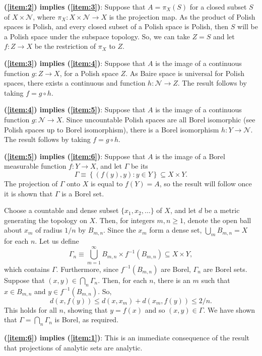 \documentclass[12pt]{article}
\begin{document}
\noindent\textbf{(\ref{item:2}) implies (\ref{item:3})}:
Suppose that $A=\pi_X(S)$ for a closed subset $S$ of $X\times \mathcal{N}$, where $\pi_X\colon X\times\mathcal{N}\to X$ is the projection map. As the product of Polish spaces is Polish, and every closed subset of a Polish space is Polish, then $S$ will be a Polish space under the subspace topology. So, we can take $Z=S$ and let $f\colon Z\to X$ be the restriction of $\pi_X$ to $Z$.

\noindent\textbf{(\ref{item:3}) implies (\ref{item:4})}:
Suppose that $A$ is the image of a continuous function $g\colon Z\to X$, for a Polish space $Z$. As Baire space is universal for Polish spaces, there exists a continuous and  function $h\colon\mathcal{N}\to Z$. The result follows by taking $f=g\circ h$.

\noindent\textbf{(\ref{item:4}) implies (\ref{item:5})}:
Suppose that $A$ is the image of a continuous function $g\colon \mathcal{N}\to X$. Since uncountable Polish spaces are all Borel isomorphic (see Polish spaces up to Borel isomorphism), there is a Borel isomorphism $h\colon Y\to\mathcal{N}$. The result follows by taking $f=g\circ h$.

\noindent\textbf{(\ref{item:5}) implies (\ref{item:6})}:
Suppose that $A$ is the image of a Borel measurable function $f\colon Y\to X$, and let $\Gamma$ be its 
\begin{equation*}
\Gamma\equiv\left\{(f(y),y)\colon y\in Y\right\}\subseteq X\times Y.
\end{equation*}
The projection of $\Gamma$ onto $X$ is equal to $f(Y)=A$, so the result will follow once it is shown that $\Gamma$ is a Borel set.

Choose a countable and dense subset $\{x_1,x_2,\ldots\}$ of $X$, and let $d$ be a metric generating the topology on $X$. Then, for integers $m,n\ge 1$, denote the open ball about $x_m$ of radius $1/n$ by $B_{m,n}$. Since the $x_m$ form a dense set, $\bigcup_mB_{m,n}=X$ for each $n$. Let us define
\begin{equation*}
\Gamma_n\equiv\bigcup_{m=1}^\infty B_{m,n}\times f^{-1}(B_{m,n})\subseteq X\times Y,
\end{equation*}
which contains $\Gamma$. Furthermore, since $f^{-1}(B_{m,n})$ are Borel, $\Gamma_n$ are Borel sets.
Suppose that $(x,y)\in\bigcap_n\Gamma_n$. Then, for each $n$, there is an $m$ such that $x\in B_{m,n}$ and $y\in f^{-1}(B_{m,n})$. So,
\begin{equation*}
d(x,f(y))\le d(x,x_m)+d(x_m,f(y))\le 2/n.
\end{equation*}
This holds for all $n$, showing that $y=f(x)$ and so $(x,y)\in \Gamma$. We have shown that $\Gamma=\bigcap_n\Gamma_n$ is Borel, as required.

\noindent\textbf{(\ref{item:6}) implies (\ref{item:1})}:
This is an immediate consequence of the result that projections of analytic sets are analytic.

\end{document}
